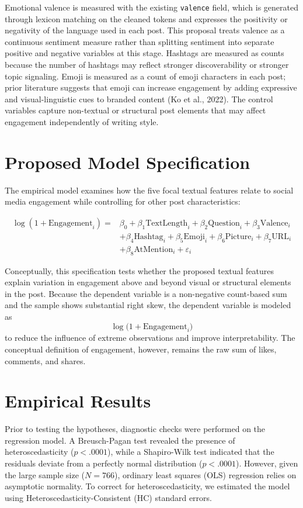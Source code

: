 \documentclass[12pt,a4paper,fontset=none]{ctexart}
\begin{document}
Emotional valence is measured with the existing \texttt{valence} field, which is generated through lexicon matching on the cleaned tokens and expresses the positivity or negativity of the language used in each post. This proposal treats valence as a continuous sentiment measure rather than splitting sentiment into separate positive and negative variables at this stage. Hashtags are measured as counts because the number of hashtags may reflect stronger discoverability or stronger topic signaling. Emoji is measured as a count of emoji characters in each post; prior literature suggests that emoji can increase engagement by adding expressive and visual-linguistic cues to branded content (Ko et al., 2022). The control variables capture non-textual or structural post elements that may affect engagement independently of writing style.

\section{Proposed Model Specification}
The empirical model examines how the five focal textual features relate to social media engagement while controlling for other post characteristics:

\begin{equation}
\begin{aligned}
\log(1 + \text{Engagement}_i) = {}& \beta_0 + \beta_1\text{TextLength}_i + \beta_2\text{Question}_i + \beta_3\text{Valence}_i \\
& + \beta_4\text{Hashtag}_i + \beta_5\text{Emoji}_i + \beta_6\text{Picture}_i + \beta_7\text{URL}_i \\
& + \beta_8\text{AtMention}_i + \varepsilon_i
\end{aligned}
\end{equation}

Conceptually, this specification tests whether the proposed textual features explain variation in engagement above and beyond visual or structural elements in the post. Because the dependent variable is a non-negative count-based sum and the sample shows substantial right skew, the dependent variable is modeled as
\[
\log\bigl(1 + \text{Engagement}_i\bigr)
\]
to reduce the influence of extreme observations and improve interpretability. The conceptual definition of engagement, however, remains the raw sum of likes, comments, and shares.

\section{Empirical Results}
Prior to testing the hypotheses, diagnostic checks were performed on the regression model. A Breusch-Pagan test revealed the presence of heteroscedasticity ($p < .0001$), while a Shapiro-Wilk test indicated that the residuals deviate from a perfectly normal distribution ($p < .0001$). However, given the large sample size ($N = 766$), ordinary least squares (OLS) regression relies on asymptotic normality. To correct for heteroscedasticity, we estimated the model using Heteroscedasticity-Consistent (HC) standard errors.
\end{document}
